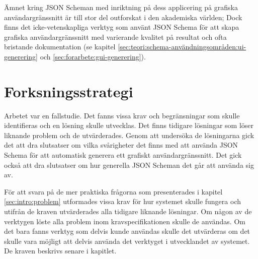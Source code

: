 
Ämnet kring JSON Scheman med inriktning på dess applicering på grafiska användargränssnitt är till stor del outforskat i den akademiska världen; Dock finns det icke-vetenskapliga verktyg som använt JSON Schema för att skapa grafiska användargränssnitt med varierande kvalitet på resultat och ofta bristande dokumentation (se kapitel \ref{sec:teori:schema-användningsområden:ui-generering} och \ref{sec:forarbete:gui-generering}).


\section{Forksningsstrategi}
\label{sec:metod:forskningsstrategi}
Arbetet var en fallstudie. Det fanns vissa krav och begränsningar som skulle identifieras och en lösning skulle utvecklas. Det finns tidigare lösningar som löser liknande problem och de utvärderades. Genom att undersöka de lösningarna gick det att dra slutsatser om vilka svårigheter det finns med att använda JSON Schema för att automatisk generera ett grafiskt användargränssnitt. Det gick också att dra slutsatser om hur generella JSON Scheman det går att använda sig av.

För att svara på de mer praktiska frågorna som presenterades i kapitel \ref{sec:intro:problem} utformades vissa krav för hur systemet skulle fungera och utifrån de kraven utvärderades alla tidigare liknande lösningar. Om någon av de verktygen löste alla problem inom kravspecifikationen skulle de användas. Om det bara fanns verktyg som delvis kunde användas skulle det utvärderas om det skulle vara möjligt att delvis använda det verktyget i utvecklandet av systemet. De kraven beskrivs senare i kapitlet.

